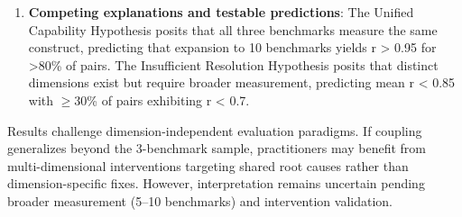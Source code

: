 \begin{enumerate}
\item \textbf{Competing explanations and testable predictions}: The Unified Capability Hypothesis posits that all three benchmarks measure the same construct, predicting that expansion to 10 benchmarks yields r > 0.95 for >80\% of pairs. The Insufficient Resolution Hypothesis posits that distinct dimensions exist but require broader measurement, predicting mean r < 0.85 with $\geq 30$\% of pairs exhibiting r < 0.7.
\end{enumerate}

Results challenge dimension-independent evaluation paradigms. If coupling generalizes beyond the 3-benchmark sample, practitioners may benefit from multi-dimensional interventions targeting shared root causes rather than dimension-specific fixes. However, interpretation remains uncertain pending broader measurement (5--10 benchmarks) and intervention validation.
